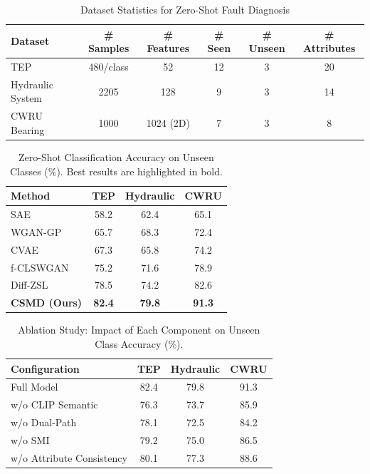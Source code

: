 \begin{table}[htbp]
\centering
\caption{Dataset Statistics for Zero-Shot Fault Diagnosis}
\label{tab:datasets}
\begin{tabular}{lccccc}
\toprule
Dataset & \# Samples & \# Features & \# Seen & \# Unseen & \# Attributes \\
\midrule
TEP & 480/class & 52 & 12 & 3 & 20 \\
Hydraulic System & 2205 & 128 & 9 & 3 & 14 \\
CWRU Bearing & 1000 & 1024 (2D) & 7 & 3 & 8 \\
\bottomrule
\end{tabular}
\end{table}

\begin{table}[htbp]
\centering
\caption{Zero-Shot Classification Accuracy on Unseen Classes (\%). Best results are highlighted in bold.}
\label{tab:comparison}
\begin{tabular}{lccc}
\toprule
Method & TEP & Hydraulic & CWRU \\
\midrule
SAE & 58.2 & 62.4 & 65.1 \\
WGAN-GP & 65.7 & 68.3 & 72.4 \\
CVAE & 67.3 & 65.8 & 74.2 \\
f-CLSWGAN & 75.2 & 71.6 & 78.9 \\
Diff-ZSL & 78.5 & 74.2 & 82.6 \\
\textbf{CSMD (Ours)} & \textbf{82.4} & \textbf{79.8} & \textbf{91.3} \\
\bottomrule
\end{tabular}
\end{table}

\begin{table}[htbp]
\centering
\caption{Ablation Study: Impact of Each Component on Unseen Class Accuracy (\%).}
\label{tab:ablation}
\begin{tabular}{lccc}
\toprule
Configuration & TEP & Hydraulic & CWRU \\
\midrule
Full Model & 82.4 & 79.8 & 91.3 \\
w/o CLIP Semantic & 76.3 & 73.7 & 85.9 \\
w/o Dual-Path & 78.1 & 72.5 & 84.2 \\
w/o SMI & 79.2 & 75.0 & 86.5 \\
w/o Attribute Consistency & 80.1 & 77.3 & 88.6 \\
\bottomrule
\end{tabular}
\end{table}

